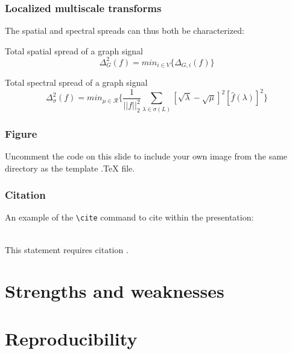 \documentclass{beamer}
\begin{document}
\begin{frame}
  \frametitle{Localized multiscale transforms}
  
  The spatial and spectral spreads can thus both be characterized:

  \begin{block}{Total spatial spread of a graph signal}
    \begin{equation}
      \Delta_{G}^2(f) = min_{i \in V} \{ \Delta_{G, i} (f) \}
    \end{equation}
  \end{block}  
  \begin{block}{Total spectral spread of a graph signal}
    \begin{equation}
      \Delta_{\sigma}^2(f) = min_{\mu \in \mathcal{R}} \bigg\{ \frac{1}{|| f ||_2^2} \sum_{\lambda \in \sigma(L)} [\sqrt{\lambda} - \sqrt{\mu}]^2 [\hat{f}(\lambda)]^2 \bigg\}
    \end{equation}
  \end{block}  
 \end{frame} 
  



\begin{frame}
\frametitle{Figure}
Uncomment the code on this slide to include your own image from the same directory as the template .TeX file.
\end{frame}


\begin{frame}[fragile] %
\frametitle{Citation}
An example of the \verb|\cite| command to cite within the presentation:\\~

This statement requires citation \cite{p1}.
\end{frame}


\section{Strengths and weaknesses}

\section{Reproducibility}
\end{document}
